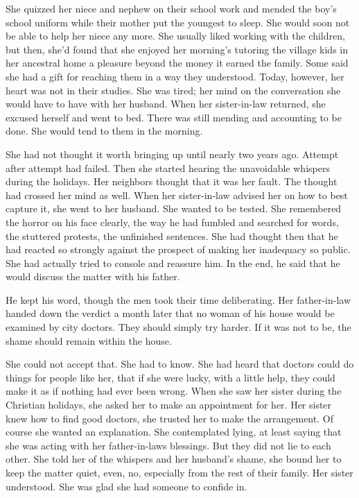 \documentclass{article}
\begin{document}
She quizzed her niece and nephew on their school work and mended the boy's school uniform while their mother put the youngest to sleep. She would soon not be able to help her niece any more. She usually liked working with the children, but then, she'd found that she enjoyed her morning's tutoring the village kids in her ancestral home a pleasure beyond the money it earned the family. Some said she had a gift for reaching them in a way they understood. Today, however, her heart was not in their studies. She was tired; her mind on the conversation she would have to have with her husband. When her sister-in-law returned, she excused herself and went to bed. There was still mending and accounting to be done. She would tend to them in the morning.

She had not thought it worth bringing up until nearly two years ago. Attempt after attempt had failed. Then she started hearing the unavoidable whispers during the holidays. Her neighbors thought that it was her fault. The thought had crossed her mind as well. When her sister-in-law advised her on how to best capture it, she went to her husband. She wanted to be tested. She remembered the horror on his face clearly, the way he had fumbled and searched for words, the stuttered protests, the unfinished sentences. She had thought then that he had reacted so strongly against the prospect of making her inadequacy so public. She had actually tried to console and reassure him. In the end, he said that he would discuss the matter with his father. 

He kept his word, though the men took their time deliberating. Her father-in-law handed down the verdict a month later that no woman of his house would be examined by city doctors. They should simply try harder. If it was not to be, the shame should remain within the house. 

She could not accept that. She had to know. She had heard that doctors could do things for people like her, that if she were lucky, with a little help, they  could make it as if nothing had ever been wrong. When she saw her sister during the Christian holidays, she asked her to make an appointment for her. Her sister knew how to find good doctors, she trusted her to make the arrangement. Of course she wanted an explanation. She contemplated lying, at least saying that she was acting with her father-in-laws blessings. But they did not lie to each other. She told her of the whispers and her husband's shame, she bound her to keep the matter quiet, even, no, especially from the rest of their family. Her sister understood. She was glad she had someone to confide in.
\end{document}
